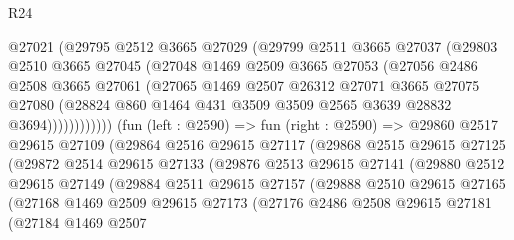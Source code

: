 \begin{lexlean}{R24}
\begin{coremodule}
                  @27021
                  (@29795
                    @2512
                    @3665
                    @27029
                    (@29799
                      @2511
                      @3665
                      @27037
                      (@29803
                        @2510
                        @3665
                        @27045
                        (@27048
                          @1469
                          @2509
                          @3665
                          @27053
                          (@27056
                            @2486
                            @2508
                            @3665
                            @27061
                            (@27065
                              @1469
                              @2507
                              @26312
                              @27071
                              @3665
                              @27075
                              @27080
                              (@28824
                                @860
                                @1464
                                @431
                                @3509
                                @3509
                                @2565
                                @3639
                                @28832
                                @3694))))))))))))
        (fun (left : @2590) =>
        fun (right : @2590) =>
        @29860
          @2517
          @29615
          @27109
          (@29864
            @2516
            @29615
            @27117
            (@29868
              @2515
              @29615
              @27125
              (@29872
                @2514
                @29615
                @27133
                (@29876
                  @2513
                  @29615
                  @27141
                  (@29880
                    @2512
                    @29615
                    @27149
                    (@29884
                      @2511
                      @29615
                      @27157
                      (@29888
                        @2510
                        @29615
                        @27165
                        (@27168
                          @1469
                          @2509
                          @29615
                          @27173
                          (@27176
                            @2486
                            @2508
                            @29615
                            @27181
                            (@27184
                              @1469
                              @2507

\end{coremodule}
\end{lexlean}
